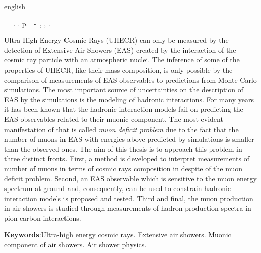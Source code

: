 \begin{resumo}[Abstract]        
 \begin{otherlanguage*}{english}
	\begin{flushleft} 
		\setlength{\absparsep}{0pt} %
 		\SingleSpacing 
 		\imprimirautorabr~ ~\textbf{\imprimirtitulo}. \imprimirdata.  \pageref{LastPage}p. 
		\imprimirtipotrabalho~-~\imprimirinstituicao, \imprimirlocal, 	\imprimirdata. 
 	\end{flushleft}
	\OnehalfSpacing 

Ultra-High Energy Cosmic Rays (UHECR) can only be measured by the detection of
Extensive Air Showers (EAS) created by the interaction of the cosmic ray particle
with an atmospheric nuclei. The inference of some of the properties of UHECR,
like their mass composition, is only possible by the comparison of measurements
of EAS observables to predictions from Monte Carlo simulations.
The most important source of uncertainties on the description of EAS by the simulations
is the modeling of hadronic interactions.
For many years it has been known that the hadronic interaction models fail on predicting the EAS
observables related to their muonic component. The most evident manifestation of that is
called \emph{muon deficit problem} due to the fact that the number of muons in EAS
with energies above  predicted by simulations is smaller than the observed ones.
The aim of this thesis is to approach this problem in three distinct fronts.
First, a method is developed to interpret measurements of number of muons in terms
of cosmic rays composition in despite of the muon deficit problem.
Second, an EAS observable which is sensitive to the muon energy spectrum at ground
and, consequently, can be used to constrain hadronic interaction models is proposed
and tested. Third and final, the muon production in air showers is studied through
measurements of hadron production spectra in pion-carbon interactions.  

   \vspace{\onelineskip}
 
   \noindent 
   \textbf{Keywords}:Ultra-high energy cosmic rays. Extensive air showers. Muonic component of air showers. Air shower physics. 
 \end{otherlanguage*}
\end{resumo}
